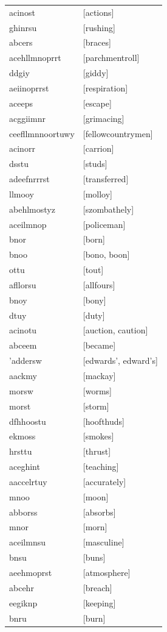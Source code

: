 \documentclass{article}
\begin{document}
\begin{tabular}{ll}
acinost & [actions] \\
ghinrsu & [rushing] \\
abcers & [braces] \\
acehllmnoprrt & [parchmentroll] \\
ddgiy & [giddy] \\
aeiinoprrst & [respiration] \\
aceeps & [escape] \\
acggiimnr & [grimacing] \\
ceefllmnnoortuwy & [fellowcountrymen] \\
acinorr & [carrion] \\
dsstu & [studs] \\
adeefnrrrst & [transferred] \\
llmooy & [molloy] \\
abehlmostyz & [szombathely] \\
aceilmnop & [policeman] \\
bnor & [born] \\
bnoo & [bono, boon] \\
ottu & [tout] \\
afllorsu & [allfours] \\
bnoy & [bony] \\
dtuy & [duty] \\
acinotu & [auction, caution] \\
abceem & [became] \\
'addersw & [edwards', edward's] \\
aackmy & [mackay] \\
morsw & [worms] \\
morst & [storm] \\
dfhhoostu & [hoofthuds] \\
ekmoss & [smokes] \\
hrsttu & [thrust] \\
aceghint & [teaching] \\
aaccelrtuy & [accurately] \\
mnoo & [moon] \\
abborss & [absorbs] \\
mnor & [morn] \\
aceilmnsu & [masculine] \\
bnsu & [buns] \\
aeehmoprst & [atmosphere] \\
abcehr & [breach] \\
eegiknp & [keeping] \\
bnru & [burn] \\

\end{tabular}
\end{document}
